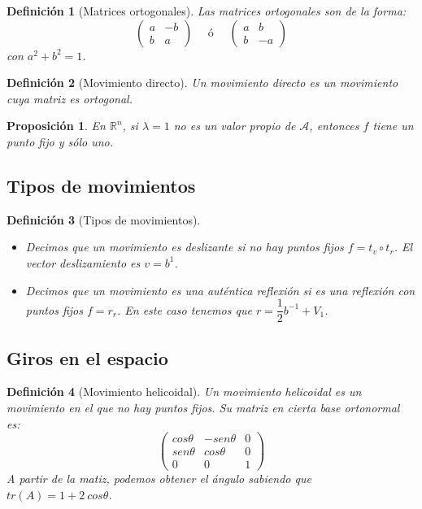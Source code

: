 \documentclass[11pt, a4paper]{article}
\newif\IfInSansMode
\newcommand{\R}{\mathbb{R}}
\theoremstyle{theorem-style}
\newtheorem{nprop}{Proposición}[section]
\theoremstyle{definition-style}
\newtheorem{ndef}{Definición}[section]
\theoremstyle{remark-style}
\theoremstyle{example-style}
\begin{document}
\begin{ndef}[Matrices ortogonales]
  Las matrices ortogonales son de la forma:
  \[
    \begin{pmatrix}
      a & -b \\
      b & a 
    \end{pmatrix} \quad \text { ó } \quad \begin{pmatrix}
      a & b \\
      b & -a 
    \end{pmatrix}
  \]
  con $a^2+b^2 = 1$.
\end{ndef}

\begin{ndef}[Movimiento directo]
  Un movimiento directo es un movimiento cuya matriz es ortogonal. 
\end{ndef}
\begin{nprop}
  En $\R^n$, si $\lambda = 1$ no es un valor propio de $\mathcal A$, entonces $f$ tiene un punto fijo y sólo uno.
\end{nprop}

\subsection{Tipos de movimientos}

\begin{ndef}[Tipos de movimientos]\hfill
  \begin{itemize}
\item Decimos que un movimiento es \textit{deslizante} si no hay puntos fijos $f = t_v \circ t_r$. El vector deslizamiento es $v=b^1$.
\item Decimos que un movimiento es una \textit{auténtica reflexión} si es una reflexión con puntos fijos $f=r_r$. En este caso tenemos que $r= \dfrac{1}{2}b^{-1}+V_1$.
\end{itemize}
\end{ndef}

\subsection{Giros en el espacio}
\begin{ndef}[Movimiento helicoidal]
  Un movimiento helicoidal es un movimiento en el que no hay puntos fijos. Su matriz en cierta base ortonormal es:
  \[
    \begin{pmatrix}
      cos \theta & -sen\theta & 0 \\
      sen \theta & cos\theta & 0\\
      0 & 0 & 1
    \end{pmatrix} 
  \]
  A partir de la matiz, podemos obtener el ángulo sabiendo que $tr(A) = 1+2 \ cos\theta$.
\end{ndef}
\end{document}
